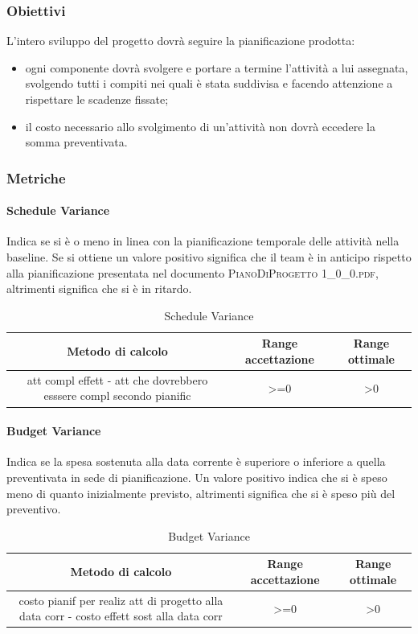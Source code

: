 		\subsubsection{Obiettivi}
		L’intero sviluppo del progetto dovrà seguire la pianificazione prodotta:
		\begin{itemize}
			\item ogni componente dovrà svolgere e portare a termine l'attività a lui assegnata, svolgendo tutti i compiti nei quali è stata suddivisa e facendo attenzione a rispettare le scadenze fissate;
			\item il costo necessario allo svolgimento di un'attività non dovrà eccedere la somma
			preventivata.
		\end{itemize}
		\subsubsection{Metriche}
			\paragraph{Schedule Variance}
			Indica se si è o meno in linea con la pianificazione temporale delle attività nella baseline.
			Se si ottiene un valore positivo significa che il team è in anticipo rispetto alla pianificazione presentata nel documento \textsc{PianoDiProgetto 1\_0\_0.pdf}, altrimenti significa che si è in ritardo.
			\begin{table}[H]
				\begin{center}
					\begin{tabular}{|c|c|c|}
						\hline
						\textbf{Metodo di calcolo} & \textbf{Range accettazione} & \textbf{Range ottimale} \\
						\hline
						att compl effett - att che dovrebbero esssere compl secondo pianific  & >=0  & >0 \\
						\hline
					\end{tabular}
				\end{center}
				\caption{Schedule Variance}
			\end{table}
		
		\paragraph{Budget Variance}
		Indica se la spesa sostenuta alla data corrente è superiore o inferiore a quella preventivata in sede di pianificazione.
		Un valore positivo indica che si è speso meno di quanto inizialmente previsto, altrimenti significa che si è speso più del preventivo.
		\begin{table}[H]
			\begin{center}
				\begin{tabular}{|c|c|c|}
					\hline
					\textbf{Metodo di calcolo} & \textbf{Range accettazione} & \textbf{Range ottimale} \\
					\hline
					costo pianif per realiz att di progetto alla data corr - costo effett sost alla data corr & >=0  & >0 \\
					\hline
				\end{tabular}
			\end{center}
			\caption{Budget Variance}
		\end{table}
	
